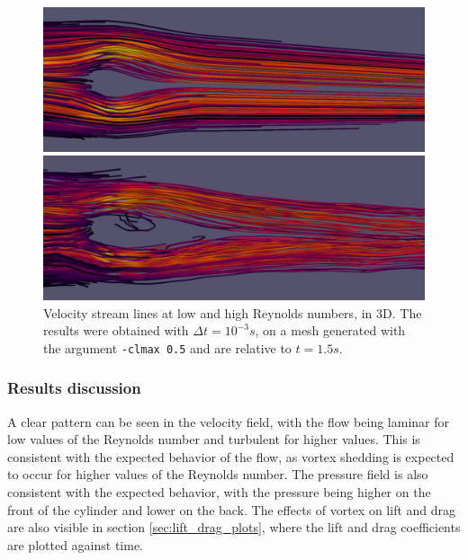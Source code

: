\begin{figure}[h]
  \begin{minipage}{\linewidth}
  \includegraphics[width=\linewidth]{image/3d-arrows-20.png}\hfill
  \end{minipage}%
  \par
  \begin{minipage}{\linewidth}
  \includegraphics[width=\linewidth]{image/3d-arrows-200.png}\hfill
  \end{minipage}%
  
  \caption{Velocity stream lines at low and high Reynolds numbers, in 3D. The results were obtained with $\Delta t = 10^{-3}s$, on a mesh generated with the argument \texttt{-clmax 0.5} and are relative to $t = 1.5s$.}
  \label{fig:velocity-3d}
\end{figure}

\subsubsection{Results discussion}
A clear pattern can be seen in the velocity field, with the flow being laminar for low values of the Reynolds number and turbulent for higher values. This is consistent with the expected behavior of the flow, as vortex shedding is expected to occur for higher values of the Reynolds number. The pressure field is also consistent with the expected behavior, with the pressure being higher on the front of the cylinder and lower on the back.
The effects of vortex on lift and drag are also visible in section \ref{sec:lift_drag_plots}, where the lift and drag coefficients are plotted against time.